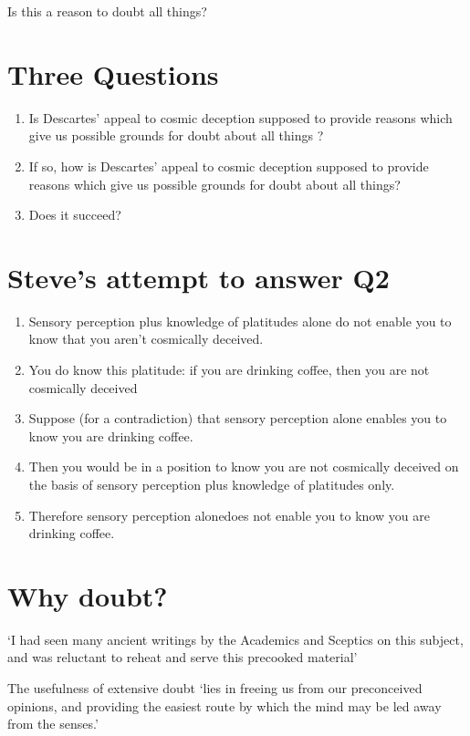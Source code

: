 \documentclass[12pt]{extarticle}
\begin{document}
\begin{multicols*}{3}
Is this a reason to doubt all things?

\section{Three Questions}

\begin{enumerate}
\item Is Descartes’ appeal to cosmic deception supposed to provide reasons which give us possible grounds for doubt about all things ?
\item If so, how is Descartes’ appeal to cosmic deception supposed to provide  reasons which give us possible grounds for doubt about all things?
\item Does it succeed?
\end{enumerate}
 
\section{Steve’s attempt to answer Q2}
\begin{enumerate}
\item Sensory perception plus knowledge of platitudes alone do not enable you to know that you aren’t cosmically deceived.
\item You do know this platitude: if you are drinking coffee, then you are not cosmically deceived
\item Suppose (for a contradiction) that sensory perception alone enables you to know you are drinking coffee.
\item Then you would be in a position to know you are not cosmically deceived on the basis of sensory perception plus knowledge of platitudes only.
\item Therefore sensory perception alonedoes not enable you to know you are drinking coffee.
\end{enumerate}
 
\section{Why doubt?}
‘I had seen many ancient writings by the Academics and Sceptics on this subject, 
and was reluctant to reheat and serve this precooked material’
\citep[p.~94, AT VII:130]{descartes:1985_csm2}
 
The usefulness of extensive doubt ‘lies in freeing us from our preconceived opinions, 
and providing the easiest route by which the mind may be led away from the senses.’
 

    









\footnotesize


\end{multicols*}
\end{document}

